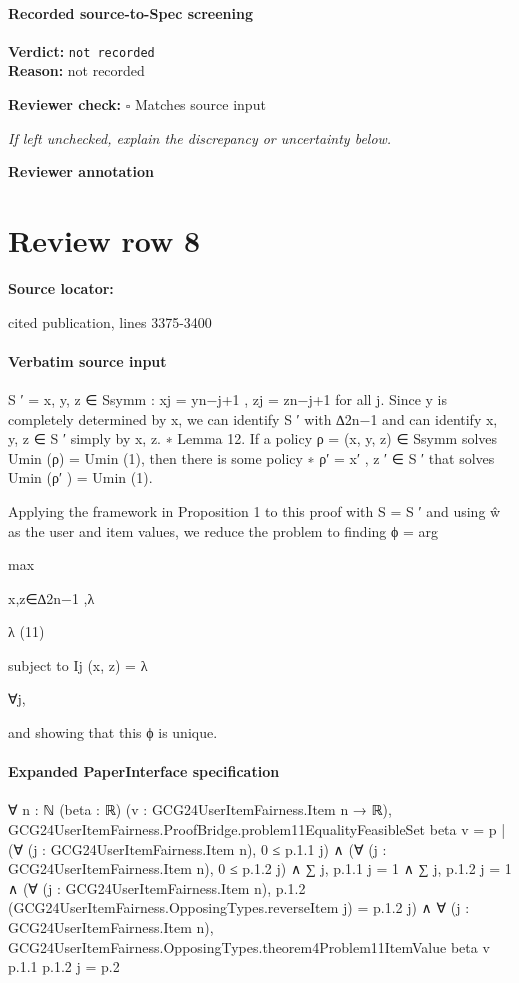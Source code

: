 \documentclass[10pt]{article}
\newcommand{\reviewerbox}{%
  \par\noindent\fbox{\parbox{0.96\linewidth}{\rule{0pt}{0.38in}}}\par
}
\newcommand{\reviewmatch}[1]{%
  \par\noindent\textbf{Reviewer check:} $\square$\; #1\par
  \noindent\emph{If left unchecked, explain the discrepancy or uncertainty below.}\par
}
\begin{document}
\paragraph{Recorded source-to-Spec screening}
\textbf{Verdict:} \texttt{not recorded}
\\
\textbf{Reason:} not recorded
\reviewmatch{Matches source input}
\noindent\textbf{Reviewer annotation}\par
\reviewerbox
\clearpage
\hypertarget{source-claim-41e201d4ec448012}{}
\section*{Review row 8}
\textbf{Source locator:} {\footnotesize\raggedright cited publication, lines 3375-\allowbreak{}3400\par}
\paragraph{Verbatim source input}
\begin{ReviewVerbatim}
S ′ = {x, y, z ∈ Ssymm : xj = yn−j+1 , zj = zn−j+1 for all j}.
Since y is completely determined by x, we can identify S ′ with ∆2n−1 and can identify x, y, z ∈ S ′
simply by x, z.
∗
Lemma 12. If a policy ρ = (x, y, z) ∈ Ssymm solves Umin (ρ) = Umin
(1), then there is some policy
∗
ρ′ = x′ , z ′ ∈ S ′ that solves Umin (ρ′ ) = Umin
(1).

Applying the framework in Proposition 1 to this proof with S = S ′ and using ŵ as the user and item
values, we reduce the problem to finding
ϕ = arg

max

x,z∈∆2n−1 ,λ

λ
(11)

subject to Ij (x, z) = λ

∀j,

and showing that this ϕ is unique.
\end{ReviewVerbatim}


\paragraph{Expanded PaperInterface specification}
\begin{ReviewVerbatim}
∀ {n : ℕ} (beta : ℝ) (v : GCG24UserItemFairness.Item n → ℝ),
  GCG24UserItemFairness.ProofBridge.problem11EqualityFeasibleSet beta v =
    {p |
      (∀ (j : GCG24UserItemFairness.Item n), 0 ≤ p.1.1 j) ∧
        (∀ (j : GCG24UserItemFairness.Item n), 0 ≤ p.1.2 j) ∧
          ∑ j, p.1.1 j = 1 ∧
            ∑ j, p.1.2 j = 1 ∧
              (∀ (j : GCG24UserItemFairness.Item n),
                  p.1.2 (GCG24UserItemFairness.OpposingTypes.reverseItem j) = p.1.2 j) ∧
                ∀ (j : GCG24UserItemFairness.Item n),
                  GCG24UserItemFairness.OpposingTypes.theorem4Problem11ItemValue beta v p.1.1 p.1.2 j = p.2}
\end{ReviewVerbatim}
\end{document}
